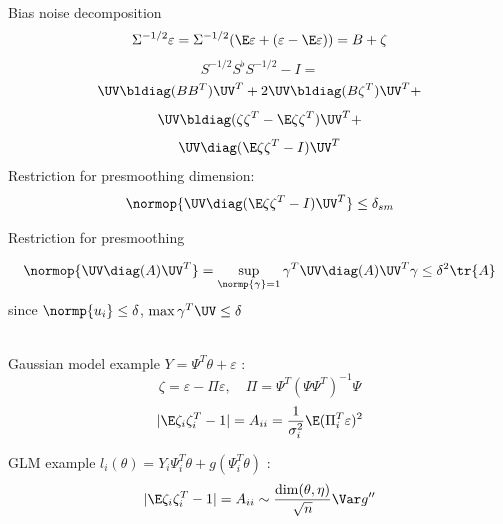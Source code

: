 \documentclass[9pt,english]{beamer}   %
\begin{document}
\begin{frame}{Bias noise decomposition}
\[
\Sigma^{-1/2} \varepsilon = \Sigma^{-1/2} (\E\varepsilon  + (\varepsilon  - \E\varepsilon) )   = B + \zeta
\]
\[
S^{-1/2} S^{\flat}  S^{-1/2} - I = 
\]
\[
\UV \bldiag( B B^T ) \UV^T + 2 \UV \bldiag( B \zeta^T ) \UV^T +
\]\[
\UV \bldiag(  \zeta \zeta^T  - \E \zeta \zeta^T) \UV^T  +
\]\[
\UV \diag(\E \zeta \zeta^T - I) \UV^T 
\]
Restriction for presmoothing dimension:
\[
\normop{
\UV \diag(\E \zeta \zeta^T - I) \UV^T  
} \leq \delta_{sm}
\] 
\end{frame}

\begin{frame}{Restriction for presmoothing}

\[
\normop{
\UV \diag(A) \UV^T  
} = \sup_{\normp{\gamma} = 1} \gamma^{T} \UV \diag(A) \UV^T  \gamma  \leq \delta^2 \tr\{A\}
\]
since $\normp{u_i} \leq \delta$,  $\max \gamma^T \UV \leq \delta$

$ $ \\

Gaussian model example $Y = \Psi^T \theta + \varepsilon$ :
\[
\zeta = \varepsilon - \Pi \varepsilon,
\quad
\Pi = \Psi^T (\Psi\Psi^T)^{-1} \Psi
\]
\[
 | \E \zeta_i \zeta_i^{T} - 1 | = A_{ii}   = \frac{1}{\sigma^2_i}  \E  (\Pi_i^T \varepsilon)^2
\]

GLM example  $l_i (\theta) = Y_i \Psi_i^T\theta + g(\Psi_i^T\theta)$ :
\[
| \E \zeta_i \zeta_i^{T} - 1 | = A_{ii} \sim \frac{\dim(\theta, \eta)}{\sqrt{n}}  \Var  g''
\]

\end{frame}



\end{document}

